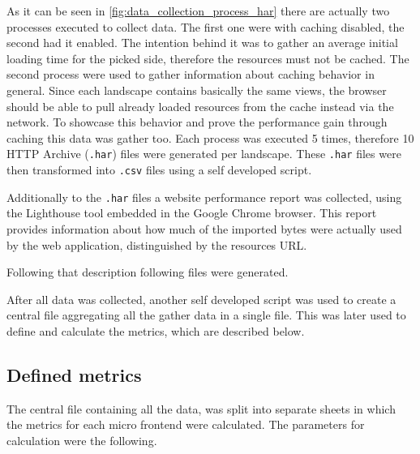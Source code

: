 As it can be seen in \ref{fig:data_collection_process_har} there are actually two processes executed to collect data. The first one were with caching disabled, the second had it enabled. The intention behind it was to gather an average initial loading time for the picked side, therefore the resources must not be cached. 
The second process were used to gather information about caching behavior in general. Since each landscape contains basically the same views, the browser should be able to pull already loaded resources from the cache instead via the network. To showcase this behavior and prove the performance gain through caching this data was gather too.
Each process was executed 5 times, therefore 10 HTTP Archive (\texttt{.har}) files were generated per landscape. These \texttt{.har} files were then transformed into \texttt{.csv} files using a self developed script. 

Additionally to the \texttt{.har} files a website performance report was collected, using the Lighthouse tool embedded in the Google Chrome browser. This report provides information about how much of the imported bytes were actually used by the web application, distinguished by the resources URL.

Following that description following files were generated.

After all data was collected, another self developed script was used to create a central file aggregating all the gather data in a single file. This was later used to define and calculate the metrics, which are described below.

\subsection{Defined metrics}

The central file containing all the data, was split into separate sheets in which the metrics for each micro frontend were calculated. The parameters for calculation were the following.

